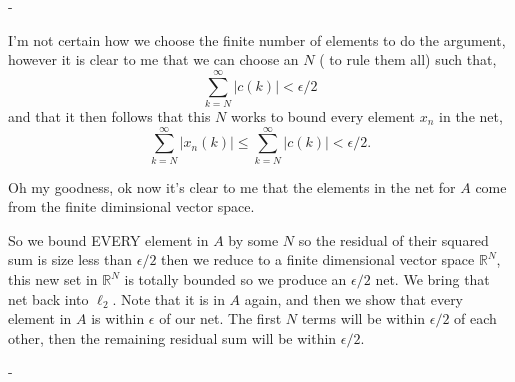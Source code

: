 \documentclass[12pt]{article}
\makeatletter
\theoremstyle{ex215}
\newcounter{probcount}
\newlength\probsep
\newlength\pshrinking
\newenvironment{problems}%
  {\ifhmode\unskip\par\fi\setcounter{probcount}{0}\probsep\parskip
  \sbox\@tempboxa{\textbf{9.}}\pshrinking\wd\@tempboxa\advance\pshrinking\labelsep
  \advance\linewidth -\pshrinking
  \advance\@totalleftmargin\pshrinking
  \advance\leftskip\pshrinking}%
  {\ifhmode\unskip \par\fi\advance\leftskip-\pshrinking}%
\renewenvironment{proof}[1][\proofname]{\par
  \pushQED{\qed}%
  \normalfont \topsep6\p@\@plus6\p@\relax
  \trivlist
  \@topsep \topsep
  \item[\hskip\labelsep
        \itshape
    #1\@addpunct{.}]\ignorespaces
}{%
  \popQED\endtrivlist\@endpefalse
}
\newcommand{\Reals}{\ensuremath{\mathbb R}}
\let\RR\Reals
\makeatother
\begin{document}
\begin{problems}
\begin{proof}
  I'm not certain how we choose the finite number of elements to do the argument, however it is clear to me that we can choose an $N$ ( to rule them all) such that, 
  \begin{equation*}
    \sum_{k = N}^\infty |c(k)| < \epsilon/2
  \end{equation*}
  and that it then follows that this $N$ works to bound every element $x_n$ in the net, 
  \begin{equation*}
    \sum_{k = N}^\infty |x_n(k)|  \leq  \sum_{k = N}^\infty |c(k)| < \epsilon/2.
  \end{equation*}

  Oh my goodness, ok now it's clear to me that the elements in the net for $A$ come from the finite diminsional vector space. 

  So we bound EVERY element in $A$ by some $N$ so the residual of their squared sum is size less than $\epsilon/2$ then we reduce to a finite dimensional vector space $\RR^N$, this new set in $\RR^N$ is totally bounded so we produce an $\epsilon/2$ net. We bring that net back into $\ell_2$. Note that it is in $A$ again, and then we show that every element in $A$ is within $\epsilon$ of our net. The first $N$ terms will be within $\epsilon/2$ of each other, then the remaining residual sum will be within $\epsilon/2$. 
  
\end{proof}


















\end{problems}
\end{document}

